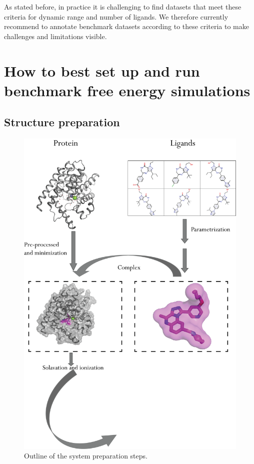 \documentclass[9pt,bestpractices]{livecoms}
\begin{document}
As stated before, in practice it is challenging to find datasets that meet these criteria for dynamic range and number of ligands. We therefore currently recommend to annotate benchmark datasets according to these criteria to make challenges and limitations visible.

 
\section{How to best set up and run benchmark free energy simulations}

\subsection{Structure preparation}
\label{sec:prep}

\begin{figure}
    \centering
    \includegraphics[width=.6\textwidth]{system_preparation.png}
    \caption{Outline of the system preparation steps.}
    \label{fig:system_preparation}
\end{figure}
\end{document}
